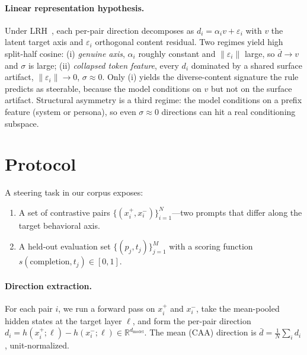 \documentclass[11pt]{article}
\begin{document}
\paragraph{Linear representation hypothesis.}
Under
LRH~\citep{mikolov2013linguistic,park2023linear,elhage2022superposition},
each per-pair direction decomposes as
$d_i = \alpha_i v + \varepsilon_i$ with $v$ the latent target axis
and $\varepsilon_i$ orthogonal content residual. Two regimes yield
high split-half cosine: (i) \emph{genuine axis}, $\alpha_i$ roughly
constant and $\|\varepsilon_i\|$ large, so $\bar{d} \!\to\! v$ and
$\sigma$ is large; (ii) \emph{collapsed token feature}, every $d_i$
dominated by a shared surface artifact, $\|\varepsilon_i\| \!\to\!
0$, $\sigma \!\approx\! 0$. Only (i) yields the diverse-content
signature the rule predicts as steerable, because the model
conditions on $v$ but not on the surface artifact. Structural
asymmetry is a third regime: the model conditions on a prefix
feature (system or persona), so even $\sigma \!\approx\! 0$
directions can hit a real conditioning subspace.

\section{Protocol}

A steering task in our corpus exposes:
\begin{enumerate}
\item A set of contrastive pairs
$\{(x_i^+, x_i^-)\}_{i=1}^N$---two prompts that differ along the
target behavioral axis.
\item A held-out evaluation set
$\{(p_j, t_j)\}_{j=1}^M$ with a scoring function
$s(\text{completion}, t_j) \in [0, 1]$.
\end{enumerate}

\paragraph{Direction extraction.}
For each pair $i$, we run a forward pass on $x_i^+$ and $x_i^-$,
take the mean-pooled hidden states at the target layer $\ell$, and
form the per-pair direction
$d_i = h(x_i^+; \ell) - h(x_i^-; \ell) \in \mathbb{R}^{d_{\text{model}}}$.
The mean (CAA) direction is $\bar d = \tfrac{1}{N}\sum_i d_i$,
unit-normalized.
\end{document}
